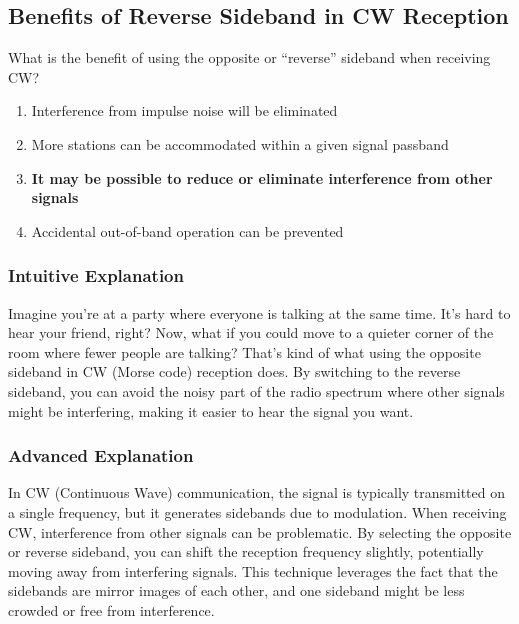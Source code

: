 \subsection{Benefits of Reverse Sideband in CW Reception}
\label{G4A02}

\begin{tcolorbox}[colback=gray!10!white,colframe=black!75!black,title=G4A02]
What is the benefit of using the opposite or “reverse” sideband when receiving CW?
\begin{enumerate}[label=\Alph*),noitemsep]
    \item Interference from impulse noise will be eliminated
    \item More stations can be accommodated within a given signal passband
    \item \textbf{It may be possible to reduce or eliminate interference from other signals}
    \item Accidental out-of-band operation can be prevented
\end{enumerate}
\end{tcolorbox}

\subsubsection*{Intuitive Explanation}
Imagine you're at a party where everyone is talking at the same time. It's hard to hear your friend, right? Now, what if you could move to a quieter corner of the room where fewer people are talking? That's kind of what using the opposite sideband in CW (Morse code) reception does. By switching to the reverse sideband, you can avoid the noisy part of the radio spectrum where other signals might be interfering, making it easier to hear the signal you want.

\subsubsection*{Advanced Explanation}
In CW (Continuous Wave) communication, the signal is typically transmitted on a single frequency, but it generates sidebands due to modulation. When receiving CW, interference from other signals can be problematic. By selecting the opposite or reverse sideband, you can shift the reception frequency slightly, potentially moving away from interfering signals. This technique leverages the fact that the sidebands are mirror images of each other, and one sideband might be less crowded or free from interference.

